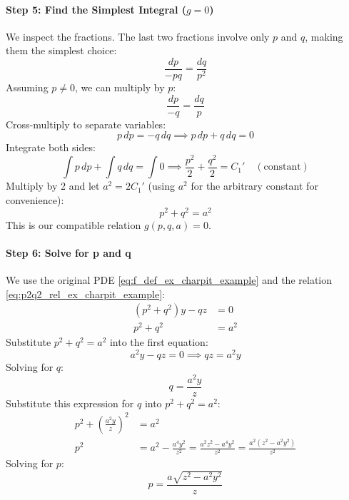 \documentclass{article}
\theoremstyle{remark}
\begin{document}
	\paragraph{Step 5: Find the Simplest Integral ($g=0$)}
	We inspect the fractions. The last two fractions involve only $p$ and $q$, making them the simplest choice:
	\begin{equation*}
		\frac{dp}{-pq} = \frac{dq}{p^2}
	\end{equation*}
	Assuming $p \neq 0$, we can multiply by $p$:
	\begin{equation*}
		\frac{dp}{-q} = \frac{dq}{p}
	\end{equation*}
	Cross-multiply to separate variables:
	\begin{equation*}
		p \, dp = -q \, dq \implies p \, dp + q \, dq = 0
	\end{equation*}
	Integrate both sides:
	\begin{equation*}
		\int p \, dp + \int q \, dq = \int 0 \implies \frac{p^2}{2} + \frac{q^2}{2} = C_1' \quad (\text{constant})
	\end{equation*}
	Multiply by 2 and let $a^2 = 2C_1'$ (using $a^2$ for the arbitrary constant for convenience):
	\begin{equation} \label{eq:p2q2_rel_ex_charpit_example}
		p^2 + q^2 = a^2
	\end{equation}
	This is our compatible relation $g(p,q,a)=0$.
	
	\paragraph{Step 6: Solve for p and q}
	We use the original PDE \eqref{eq:f_def_ex_charpit_example} and the relation \eqref{eq:p2q2_rel_ex_charpit_example}:
	\begin{align*}
		(p^2 + q^2)y - qz &= 0 \\
		p^2 + q^2 &= a^2
	\end{align*}
	Substitute $p^2+q^2=a^2$ into the first equation:
	\begin{equation*}
		a^2 y - qz = 0 \implies qz = a^2 y
	\end{equation*}
	Solving for $q$:
	\begin{equation} \label{eq:q_sol_ex_charpit_example}
		q = \frac{a^2 y}{z}
	\end{equation}
	Substitute this expression for $q$ into $p^2 + q^2 = a^2$:
	\begin{align*}
		p^2 + \left(\frac{a^2 y}{z}\right)^2 &= a^2 \\
		p^2 &= a^2 - \frac{a^4 y^2}{z^2} = \frac{a^2 z^2 - a^4 y^2}{z^2} = \frac{a^2 (z^2 - a^2 y^2)}{z^2}
	\end{align*}
	Solving for $p$:
	\begin{equation} \label{eq:p_sol_ex_charpit_example}
		p = \frac{a \sqrt{z^2 - a^2 y^2}}{z}
	\end{equation}
	
\end{document}
